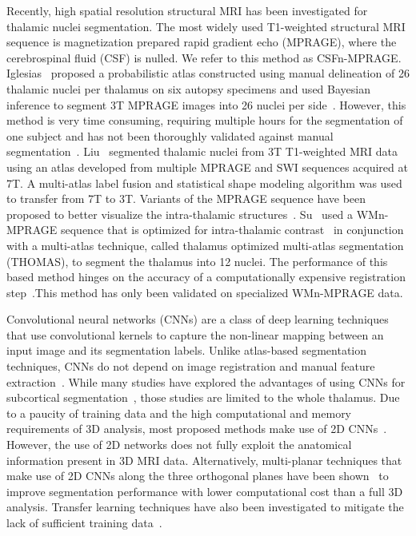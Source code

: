Recently, high spatial resolution structural MRI has been investigated for thalamic nuclei segmentation. The most widely used T1-weighted structural MRI sequence is magnetization prepared rapid gradient echo (MPRAGE), where the cerebrospinal fluid (CSF) is nulled. We refer to this method as CSFn-MPRAGE\@. Iglesias~\cite{iglesias_Probabilistic_2018} proposed a probabilistic atlas constructed using manual delineation of 26 thalamic nuclei per thalamus on six autopsy specimens and used Bayesian inference to segment 3T MPRAGE images into 26 nuclei per side~\cite{leemput_Encoding_2009,iglesias_Computational_2015}. However, this method is very time consuming, requiring multiple hours for the segmentation of one subject and has not been thoroughly validated against manual segmentation~\cite{iglesias_Probabilistic_2018}. Liu~\cite{ glaister_Thalamus_2017,liu_Thalamic_2015} segmented thalamic nuclei from 3T T1-weighted MRI data using an atlas developed from multiple MPRAGE and SWI sequences acquired at 7T. A multi-atlas label fusion and statistical shape modeling algorithm was used to transfer from 7T to 3T. Variants of the MPRAGE sequence have been proposed to better visualize the intra-thalamic structures~\cite{vassal_Direct_2012,sudhyadhom_High_2009}. Su~\cite{su_Thalamus_2019} used a WMn-MPRAGE sequence that is optimized for intra-thalamic contrast~\cite{tourdias_Visualization_2014} in conjunction with a multi-atlas technique, called thalamus optimized multi-atlas segmentation (THOMAS), to segment the thalamus into 12 nuclei. The performance of this based method hinges on the accuracy of a computationally expensive registration step~\cite{iglesias_Probabilistic_2018,alven_Improving_2017}.This method has only been validated on specialized WMn-MPRAGE data.

Convolutional neural networks (CNNs) are a class of deep learning techniques that use convolutional kernels to capture the non-linear mapping between an input image and its segmentation labels. Unlike atlas-based segmentation techniques, CNNs do not depend on image registration and manual feature extraction~\cite{zhu_Dilated_2019}. While many studies have explored the advantages of using CNNs for subcortical segmentation~\cite{brebisson_Deep_2015,moeskops_Automatic_2016,shakeri_Subcortical_2016,milletari_HoughCNN_2017}, those studies are limited to the whole thalamus. Due to a paucity of training data and the high computational and memory requirements of 3D analysis, most proposed methods make use of 2D CNNs~\cite{shakeri_Subcortical_2016}. However, the use of 2D networks does not fully exploit the anatomical information present in 3D MRI data. Alternatively, multi-planar techniques that make use of 2D CNNs along the three orthogonal planes have been shown~\cite{moeskops_Automatic_2016,kushibar_Automated_2018,roth_New_2014,prasoon_Deep_2013} to improve segmentation performance with lower computational cost than a full 3D analysis. Transfer learning techniques have also been investigated to mitigate the lack of sufficient training data~\cite{tajbakhsh_Convolutional_2016}.

